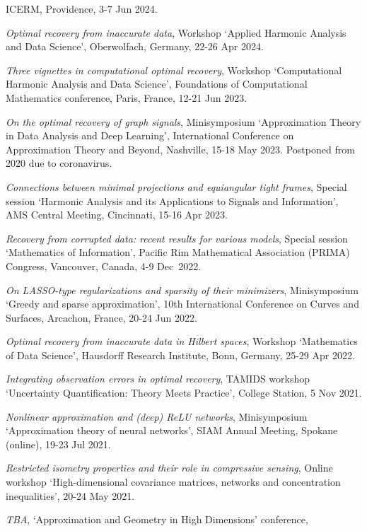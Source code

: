 \documentclass[11pt]{article}
\begin{document}
ICERM, Providence,  3-7 Jun 2024.
\item {\sl Optimal recovery from inaccurate data},
Workshop `Applied Harmonic Analysis and Data Science', Oberwolfach, Germany, 
22-26 Apr 2024.
\item {\sl Three vignettes in computational optimal recovery}, 
Workshop `Computational Harmonic Analysis and Data Science',
Foundations of Computational Mathematics conference, 
Paris, France, 12-21 Jun 2023.
\item {\sl  On the optimal recovery of graph signals},
Minisymposium `Approximation Theory in Data Analysis and Deep Learning',
International Conference on Approximation Theory and Beyond,
Nashville, 15-18 May 2023. {\small Postponed from 2020 due to coronavirus.}
\item {\sl Connections between minimal projections and equiangular tight frames}, Special session `Harmonic Analysis and its Applications to Signals and Information', AMS Central Meeting,  Cincinnati,  15-16 Apr 2023.
\item {\sl Recovery from corrupted data: recent results for various models},  Special session `Mathematics of Information',
Pacific Rim Mathematical Association (PRIMA) Congress, 
Vancouver, Canada,  4-9 Dec~2022.
\item {\sl On LASSO-type regularizations and sparsity of their minimizers}, Minisymposium `Greedy and sparse approximation',
10th International Conference on Curves and Surfaces,
Arcachon, France, 20-24 Jun 2022.
\item {\sl Optimal recovery from inaccurate data in Hilbert spaces},
Workshop `Mathematics of Data Science',
Hausdorff Research Institute, Bonn, Germany,  25-29 Apr 2022.
\item {\sl Integrating observation errors in optimal recovery},
TAMIDS workshop `Uncertainty Quantification: Theory Meets Practice',
College Station, 5 Nov 2021.
\item {\sl Nonlinear approximation and (deep) ReLU networks}, Minisymposium `Approximation theory of neural networks',
SIAM Annual Meeting, Spokane (online),
19-23 Jul 2021.
\item {\sl Restricted isometry properties and their role in compressive sensing},
Online workshop `High-dimensional covariance matrices, networks and concentration inequalities', 20-24 May 2021.
\item {\sl TBA},
`Approximation and Geometry in High Dimensions' conference,
\end{document}

